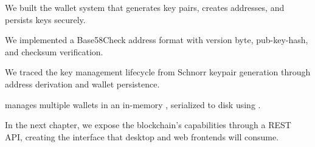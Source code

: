 \begin{chaptersummary}
\item We built the wallet system that generates key pairs, creates addresses, and persists keys securely.
\item We implemented a Base58Check address format with version byte, pub-key-hash, and checksum verification.
\item We traced the key management lifecycle from Schnorr keypair generation through address derivation and wallet persistence.
\item {} manages multiple wallets in an in-memory , serialized to disk using .
\item In the next chapter, we expose the blockchain's capabilities through a REST API, creating the interface that desktop and web frontends will consume.
\end{chaptersummary}
